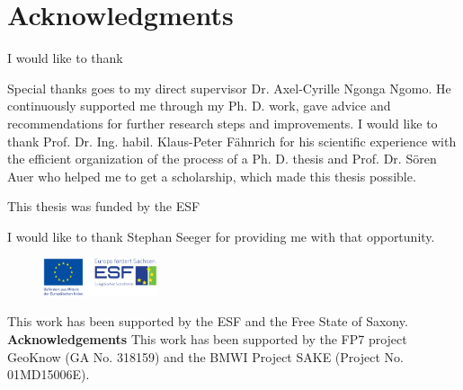 



\bigskip

\begingroup
\let\clearpage\relax
\let\cleardoublepage\relax
\let\cleardoublepage\relax
\chapter*{Acknowledgments}
I would like to thank


Special thanks goes to my direct supervisor Dr. Axel-Cyrille Ngonga Ngomo.
He continuously supported me through my Ph. D. work, gave advice and recommendations for further research steps and improvements.
I would like to thank Prof. Dr. Ing. habil. Klaus-Peter F\"ahnrich for his scientific experience with the efficient organization of the process of a Ph. D. thesis and Prof. Dr. S\"oren Auer who helped me to get a scholarship, which made this thesis possible.   

This thesis was funded by the ESF

I would like to thank Stephan Seeger for providing me with that opportunity. 

\begin{figure}
 \vspace{-10mm}
 \includegraphics[width=0.3\textwidth]{figures/esf.pdf}
\end{figure}
This work has been supported by the ESF and the Free State of Saxony.
\textbf{Acknowledgements} This work has been supported by the FP7 project GeoKnow (GA No. 318159) and the BMWI Project SAKE (Project No. 01MD15006E).
\endgroup



